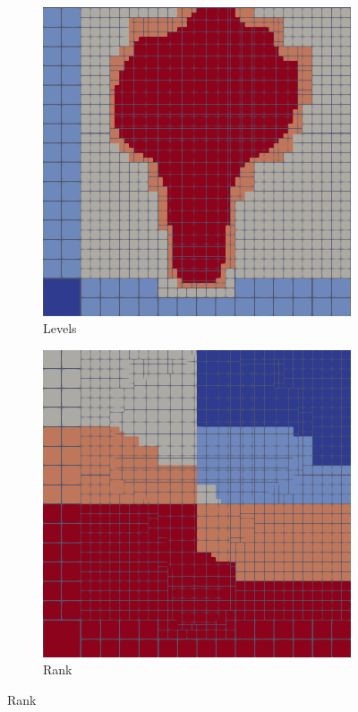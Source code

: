 \documentclass[12pt,letterpaper]{article}
\begin{document}
\begin{figure}[ht]
\centering
\caption{Quadtree}
\label{quadtree}
\begin{subfigure}[b]{0.45\textwidth}
\caption{Levels}
\label{quad_levels}
\includegraphics[width=\textwidth]{quad_level.png}
\end{subfigure}
\begin{subfigure}[b]{0.45\textwidth}
\caption{Rank}
\label{quad_rank}
\includegraphics[width=\textwidth]{quad_rank.png}
\end{subfigure}
\end{figure}
\end{document}
